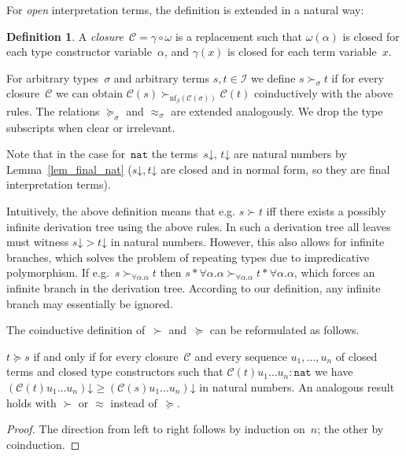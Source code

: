 \documentclass[a4paper,UKenglish,cleveref,autoref,numberwithinsect]{lipics-v2019}
\theoremstyle{definition}
\newtheorem{defn}[theorem]{Definition}
\newcommand{\Iterms}{\mathcal{I}}
\newcommand{\tapp}[2]{#1 * #2}
\newcommand{\nat}{\mathtt{nat}}
\newcommand{\cl}{\mathcal{C}}
\newcommand{\nf}{\mathrm{nf}}
\newcommand{\da}{\mathord{\downarrow}}
\begin{document}
For \emph{open} interpretation terms, the definition is
  extended in a natural way:

\begin{defn}\label{def_closure}
  A \emph{closure}~$\cl = \gamma \circ \omega$ is a
  replacement such that $\omega(\alpha)$ is closed for each
  type constructor variable~$\alpha$, and $\gamma(x)$ is closed for
  each term variable~$x$.

  For arbitrary types~$\sigma$ and arbitrary terms $s,t \in \Iterms$
  we define $s \succ_\sigma t$ if for every closure~$\cl$ we can
  obtain $\cl(s) \succ_{\nf_\beta(\cl(\sigma))} \cl(t)$ coinductively
  with the above rules. The relations $\succeq_\sigma$ and
  $\approx_\sigma$ are extended analogously. We drop the type
  subscripts when clear or irrelevant.
\end{defn}

Note that in the case for~$\nat$ the terms~$s\da$, $t\da$ are natural
numbers by Lemma~\ref{lem_final_nat} ($s\da,t\da$ are closed and in
normal form, so they are final interpretation terms).

Intuitively, the above definition means that e.g. $s \succ t$ iff
there exists a possibly infinite derivation tree using the above
rules. In such a derivation tree all leaves must witness $s\da > t\da$
in natural numbers. However, this also allows for infinite branches,
which solves the problem of repeating types due to impredicative
polymorphism. If e.g.~$s \succ_{\forall \alpha . \alpha} t$ then
$\tapp{s}{\forall\alpha.\alpha} \succ_{\forall \alpha . \alpha}
\tapp{t}{\forall\alpha.\alpha}$, which forces an infinite branch in
the derivation tree. According to our definition, any infinite branch
may essentially be ignored.

The coinductive definition of~$\succ$ and~$\succeq$ can be
reformulated as follows.

\begin{lemma}\label{lem_succ_explicit}
  $t \succeq s$ if and only if for every closure~$\cl$ and every
  sequence $u_1,\ldots,u_n$ of closed terms and closed type
  constructors such that $\cl(t) u_1 \ldots u_n : \nat$ we have
  $(\cl(t) u_1 \ldots u_n)\da \ge (\cl(s) u_1 \ldots u_n)\da$ in
  natural numbers. An analogous result holds with $\succ$ or $\approx$
  instead of~$\succeq$.
\end{lemma}

\begin{proof}
  The direction from left to right follows by induction on~$n$; the
  other by coinduction.
\end{proof}
\end{document}
